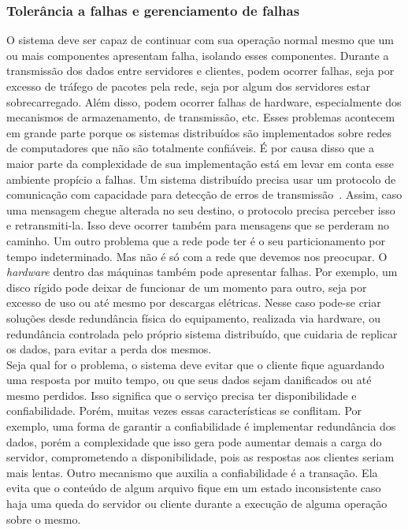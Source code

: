 	\subsubsection{Tolerância a falhas e gerenciamento de falhas}
	O sistema deve ser capaz de continuar com sua operação normal mesmo que um ou mais componentes apresentam falha, isolando esses componentes.
	Durante a transmissão dos dados entre servidores e clientes, podem ocorrer falhas, seja por excesso de tráfego de pacotes pela rede, seja por algum dos servidores estar sobrecarregado. Além disso, podem ocorrer falhas de hardware, especialmente dos mecanismos de armazenamento, de transmissão, etc. Esses problemas acontecem em grande parte porque os sistemas distribuídos são implementados sobre redes de computadores que não são totalmente confiáveis. É por causa disso que a maior parte da complexidade de sua implementação está em levar em conta esse ambiente propício a falhas. Um sistema distribuído precisa usar um protocolo de comunicação com capacidade para detecção de erros de transmissão~\cite{kon94}. Assim, caso uma mensagem chegue alterada no seu destino, o protocolo precisa perceber isso e retransmiti-la. Isso deve ocorrer também para mensagens que se perderam no caminho.
	Um outro problema que a rede pode ter é o seu particionamento por tempo indeterminado. Mas não é só com a rede que devemos nos preocupar. O \textit{hardware} dentro das máquinas também pode apresentar falhas. Por exemplo, um disco rígido pode deixar de funcionar de um momento para outro, seja por excesso de uso ou até mesmo por descargas elétricas. Nesse caso pode-se criar soluções desde redundância física do equipamento, realizada via hardware, ou redundância controlada pelo próprio sistema distribuído, que cuidaria de replicar os dados, para evitar a perda dos mesmos.\\
	 
	Seja qual for o problema, o sistema deve evitar que o cliente fique aguardando uma resposta por muito tempo, ou que seus dados sejam danificados ou até mesmo perdidos. Isso significa que o serviço precisa ter disponibilidade e confiabilidade.
	Porém, muitas vezes essas características se conflitam. Por exemplo, uma forma de garantir a confiabilidade é implementar redundância dos dados, porém a complexidade que isso gera pode aumentar demais a carga do servidor, comprometendo a disponibilidade, pois as respostas aos clientes seriam mais lentas.
	Outro mecanismo que auxilia a confiabilidade é a transação. Ela evita que o conteúdo de algum arquivo fique em um estado inconsistente caso haja uma queda do servidor ou cliente durante a execução de alguma operação sobre o mesmo.
	\\
	
